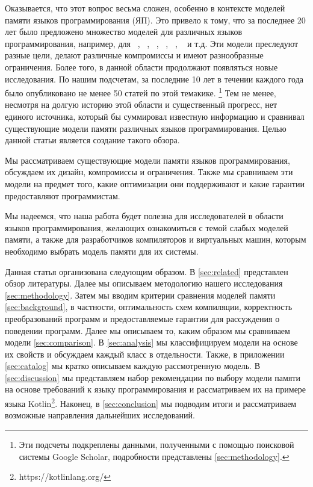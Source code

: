 Оказывается, что этот вопрос весьма сложен, 
особенно в контексте моделей памяти языков программирования (ЯП).
Это привело к тому, что за последнее 20 лет было предложено 
множество моделей для различных языков программирования, например, для 
\Java~\cite{Manson-al:POPL05, Bender-Palsberg:OOPSLA19}, \CPP~\cite{Batty-al:POPL11}, 
\LLVM~\cite{Chakraborty-Vafeiadis:CGO17}, \JS~\cite{Watt-al:PLDI2020}, 
\OCaml~\cite{Manson-al:POPL05}, \Haskell~\cite{Vollmer-al:PPoPP17} и т.д.
Эти модели преследуют разные цели, делают различные компромиссы
и имеют разнообразные ограничения.
Более того, в данной области продолжают появляться новые исследования. 
По нашим подсчетам, за последние 10 лет в течении 
каждого года было опубликовано не менее 50 статей по этой темакике.%
\footnote{Эти подсчеты подкреплены данными, полученными 
с помощью поисковой системы Google Scholar, 
подробности представлены \cref{sec:methodology}.}
Тем не менее, несмотря на долгую историю этой области и существенный прогресс,
нет единого источника, который бы суммировал 
известную информацию и сравнивал существующие 
модели памяти различных языков программирования. 
Целью данной статьи является создание такого обзора. 

Мы рассматриваем существующие модели памяти языков программирования, 
обсуждаем их дизайн, компромиссы и ограничения. 
Также мы сравниваем эти модели на предмет того,
какие оптимизации они поддерживают 
и какие гарантии предоставляют программистам. 

Мы надеемся, что наша работа будет полезна для 
исследователей в области языков программирования, 
желающих ознакомиться с темой слабых моделей памяти, 
а также для разработчиков компиляторов и виртуальных машин, 
которым необходимо выбрать модель памяти для их системы.

Данная статья организована следующим образом. 
В \cref{sec:related} представлен обзор литературы. 
Далее мы описываем методологию нашего исследования \cref{sec:methodology}.
Затем мы вводим критерии сравнения моделей памяти \cref{sec:background}, 
в частности, оптимальность схем компиляции, 
корректность преобразований программ
и предоставляемые гарантии для рассуждения 
о поведении программ.  
Далее мы описываем то, каким образом мы  
сравниваем  модели \cref{sec:comparison}. 
В \cref{sec:analysis} мы классифицируем модели на основе их свойств
и обсуждаем каждый класс в отдельности. 
Также, в приложении \ref{sec:catalog} мы кратко описываем каждую рассмотренную модель. 
В \cref{sec:discussion} мы представляем набор рекомендации 
по выбору модели памяти на основе требований к языку программирования 
и рассматриваем их на примере языка Kotlin\footnote{https://kotlinlang.org/}.
Наконец, в \cref{sec:conclusion} мы подводим итоги 
и рассматриваем возможные направления дальнейших исследований.
